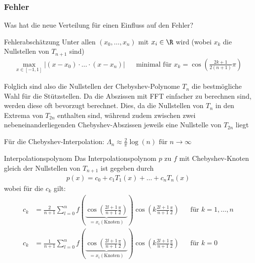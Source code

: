 \subsubsection{Fehler}
Was hat die neue Verteilung für einen Einfluss auf den Fehler?

\begin{theorem}[]{Fehlerabschätzung}
	Unter allen $(x_0, \ldots, x_n)$ mit $x_i \in \R$ wird (wobei $x_k$ die Nullstellen von $T_{n + 1}$ sind)
	\rmvspace
	\begin{align*}
		\max_{x \in [-1, 1]} |(x - x_0) \cdot \ldots \cdot (x - x_n)| &  & \text{minimal für } x_k = \cos \left( \frac{2k + 1}{2(n + 1)}\pi \right)
	\end{align*}
\end{theorem}

Folglich sind also die Nullstellen der Chebyshev-Polynome $T_n$ die bestmögliche Wahl für die Stützstellen.
Da die Abszissen mit FFT einfacher zu berechnen sind, werden diese oft bevorzugt berechnet.
Dies, da die Nullstellen von $T_n$ in den Extrema von $T_{2n}$ enthalten sind, während zudem zwischen zwei nebeneinanderliegenden Chebyshev-Abszissen jeweils eine Nullstelle von $T_{2n}$ liegt

 Für die Chebyshev-Interpolation: $\displaystyle \Lambda_n \approx \frac{2}{\pi} \log(n) \text{ für } n \rightarrow \infty$


\begin{theorem}[]{Interpolationspolynom}
	Das Interpolationspolynom $p$ zu $f$ mit Chebyshev-Knoten gleich der Nullstellen von $T_{n + 1}$ ist gegeben durch
	\begin{align*}
		p(x) = c_0 + c_1 T_1(x) + \ldots + c_n T_n(x)
	\end{align*}
	wobei für die $c_k$ gilt:
	\begin{align*}
		c_k                                                      & = \frac{2}{n + 1} \sum_{l = 0}^{n} f\left( \underbrace{\cos \left( \frac{2l + 1}{n + 1} \frac{\pi}{2} \right)}_{= x_i (\text{Knoten})} \right)
		\cos \left( k \frac{2l + 1}{n + 1} \frac{\pi}{2} \right) &                                                                                                                                                & \text{für } k = 1, \ldots, n \\
		c_k                                                      & = \frac{1}{n + 1} \sum_{l = 0}^{n} f\left( \underbrace{\cos \left( \frac{2l + 1}{n + 1} \frac{\pi}{2} \right)}_{= x_i (\text{Knoten})} \right)
		\cos \left( k \frac{2l + 1}{n + 1} \frac{\pi}{2} \right) &                                                                                                                                                & \text{für } k = 0
	\end{align*}
\end{theorem}


